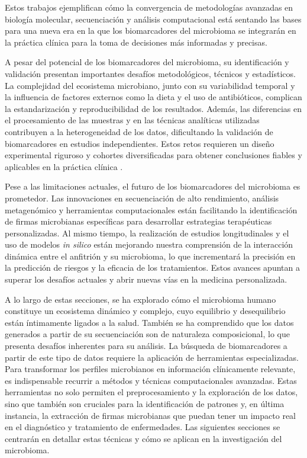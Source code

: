 Estos trabajos ejemplifican cómo la convergencia de metodologías avanzadas en biología molecular, secuenciación y análisis computacional está sentando las bases para una nueva era en la que los biomarcadores del microbioma se integrarán en la práctica clínica para la toma de decisiones más informadas y precisas.

A pesar del potencial de los biomarcadores del microbioma, su identificación y validación presentan importantes desafíos metodológicos, técnicos y estadísticos. La complejidad del ecosistema microbiano, junto con su variabilidad temporal y la influencia de factores externos como la dieta y el uso de antibióticos, complican la estandarización y reproducibilidad de los resultados. Además, las diferencias en el procesamiento de las muestras y en las técnicas analíticas utilizadas contribuyen a la heterogeneidad de los datos, dificultando la validación de biomarcadores en estudios independientes. Estos retos requieren un diseño experimental riguroso y cohortes diversificadas para obtener conclusiones fiables y aplicables en la práctica clínica \cite{buytaers2024potential, marcos2021applications}.

Pese a las limitaciones actuales, el futuro de los biomarcadores del microbioma es prometedor. Las innovaciones en secuenciación de alto rendimiento, análisis metagenómico y herramientas computacionales están facilitando la identificación de firmas microbianas específicas para desarrollar estrategias terapéuticas personalizadas. Al mismo tiempo, la realización de estudios longitudinales y el uso de modelos \textit{in silico} están mejorando nuestra comprensión de la interacción dinámica entre el anfitrión y su microbioma, lo que incrementará la precisión en la predicción de riesgos y la eficacia de los tratamientos. Estos avances apuntan a superar los desafíos actuales y abrir nuevas vías en la medicina personalizada.



A lo largo de estas secciones, se ha explorado cómo el microbioma humano constituye un ecosistema dinámico y complejo, cuyo equilibrio y desequilibrio están íntimamente ligados a la salud. También se ha comprendido que los datos generados a partir de su secuenciación son de naturaleza composicional, lo que presenta desafíos inherentes para su análisis. La búsqueda de biomarcadores a partir de este tipo de datos requiere la aplicación de herramientas especializadas. Para transformar los perfiles microbianos en información clínicamente relevante, es indispensable recurrir a métodos y técnicas computacionales avanzadas. Estas herramientas no solo permiten el preprocesamiento y la exploración de los datos, sino que también son cruciales para la identificación de patrones y, en última instancia, la extracción de firmas microbianas que puedan tener un impacto real en el diagnóstico y tratamiento de enfermedades. Las siguientes secciones se centrarán en detallar estas técnicas y cómo se aplican en la investigación del microbioma.



